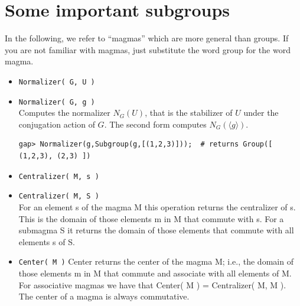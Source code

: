\section{Some important subgroups}
In the following, we refer to ``magmas'' which
  are more general than groups.  If you are not familiar with magmas, just substitute
  the word group for the word magma.
  \begin{itemize}
\item {\tt Normalizer( G, U )}
\item {\tt Normalizer( G, g )}\\[2pt]
Computes the normalizer $N_G(U)$, that is the stabilizer of $U$ under the conjugation
action of $G$. The second form computes $N_G(\langle g \rangle)$.
{\codesize
\begin{verbatim}
gap> Normalizer(g,Subgroup(g,[(1,2,3)]));  # returns Group([ (1,2,3), (2,3) ])
\end{verbatim}}
\item {\tt Centralizer( M, s )}
\item {\tt Centralizer( M, S )}\\[2pt]
For an element s of the magma M this operation returns the centralizer of s. 
This is the domain of those elements m in M that commute with s.
For a submagma S it returns the domain of those elements that commute with all elements s of S.
\item {\tt Center( M )}
Center returns the center of the magma M; i.e., the domain of those elements m in M that commute and
associate with all elements of M. 
For associative magmas we have that Center( M ) = Centralizer( M, M ).
The center of a magma is always commutative.


\end{itemize}
